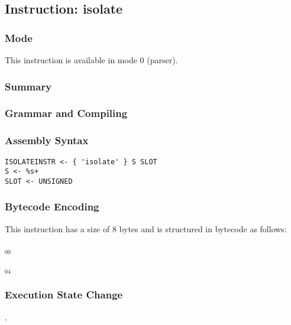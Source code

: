 \subsection{Instruction: isolate}

\subsubsection{Mode}
This instruction is available in mode 0 (parser).
\subsubsection{Summary}


\subsubsection{Grammar and Compiling}


\subsubsection{Assembly Syntax}

\begin{myquote}
\begin{verbatim}
ISOLATEINSTR <- { 'isolate' } S SLOT
S <- %s+
SLOT <- UNSIGNED
\end{verbatim}
\end{myquote}

\subsubsection{Bytecode Encoding}

This instruction has a size of 8 bytes and is structured in bytecode as follows:

$_{00}$\ 



$_{04}$\ 

\subsubsection{Execution State Change}

.


